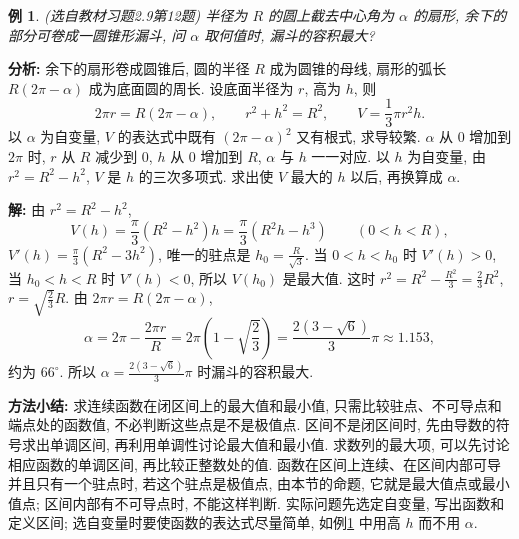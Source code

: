 \documentclass[UTF8,openany]{ctexbook}
\theoremstyle{chinesetextbook}
\newtheorem{example}{例}[section]
\newenvironment{cnsolution}{\par\indent\textbf{解:} \ignorespaces}{\par}
\begin{document}
\begin{example}\label{ex:c2-h9-12}
\textnormal{(选自教材习题2.9第12题)} 半径为 $R$ 的圆上截去中心角为 $\alpha$ 的扇形, 余下的部分可卷成一圆锥形漏斗, 问 $\alpha$ 取何值时, 漏斗的容积最大?
\end{example}
\par\indent\textbf{分析:} 余下的扇形卷成圆锥后, 圆的半径 $R$ 成为圆锥的母线, 扇形的弧长 $R(2\pi-\alpha)$ 成为底面圆的周长. 设底面半径为 $r$, 高为 $h$, 则
\[
2\pi r=R(2\pi-\alpha),\qquad r^2+h^2=R^2,\qquad V=\frac13\pi r^2h.
\]
以 $\alpha$ 为自变量, $V$ 的表达式中既有 $(2\pi-\alpha)^2$ 又有根式, 求导较繁. $\alpha$ 从 $0$ 增加到 $2\pi$ 时, $r$ 从 $R$ 减少到 $0$, $h$ 从 $0$ 增加到 $R$, $\alpha$ 与 $h$ 一一对应. 以 $h$ 为自变量, 由 $r^2=R^2-h^2$, $V$ 是 $h$ 的三次多项式. 求出使 $V$ 最大的 $h$ 以后, 再换算成 $\alpha$.
\begin{cnsolution}
由 $r^2=R^2-h^2$,
\[
V(h)=\frac\pi3(R^2-h^2)h=\frac\pi3(R^2h-h^3)\qquad(0<h<R),
\]
$\displaystyle V'(h)=\frac\pi3(R^2-3h^2)$, 唯一的驻点是 $\displaystyle h_0=\frac R{\sqrt3}$. 当 $0<h<h_0$ 时 $V'(h)>0$, 当 $h_0<h<R$ 时 $V'(h)<0$, 所以 $V(h_0)$ 是最大值. 这时 $\displaystyle r^2=R^2-\frac{R^2}3=\frac23R^2$, $\displaystyle r=\sqrt{\frac23}R$. 由 $2\pi r=R(2\pi-\alpha)$,
\[
\alpha=2\pi-\frac{2\pi r}R=2\pi\left(1-\sqrt{\frac23}\right)=\frac{2(3-\sqrt6)}3\pi\approx1.153,
\]
约为 $66^\circ$. 所以 $\displaystyle\alpha=\frac{2(3-\sqrt6)}3\pi$ 时漏斗的容积最大.
\end{cnsolution}
\par\indent\textbf{方法小结:} 求连续函数在闭区间上的最大值和最小值, 只需比较驻点、不可导点和端点处的函数值, 不必判断这些点是不是极值点. 区间不是闭区间时, 先由导数的符号求出单调区间, 再利用单调性讨论最大值和最小值. 求数列的最大项, 可以先讨论相应函数的单调区间, 再比较正整数处的值. 函数在区间上连续、在区间内部可导并且只有一个驻点时, 若这个驻点是极值点, 由本节的命题, 它就是最大值点或最小值点; 区间内部有不可导点时, 不能这样判断. 实际问题先选定自变量, 写出函数和定义区间; 选自变量时要使函数的表达式尽量简单, 如例\ref{ex:c2-h9-12} 中用高 $h$ 而不用 $\alpha$.
\end{document}
